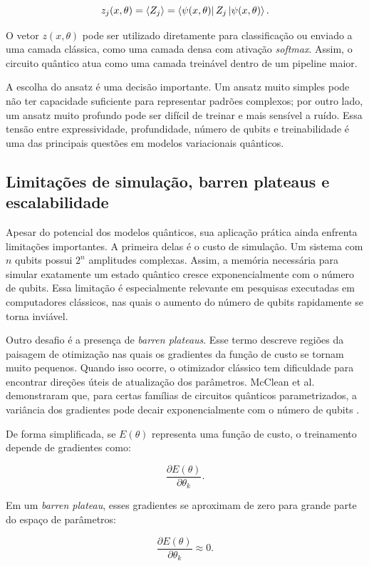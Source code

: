 \documentclass[
    12pt,
    openright,
    oneside,
    a4paper,
    english,
    brazil
]{abntex2}
\begin{document}
\[
z_j(x,\theta)
=
\langle Z_j \rangle
=
\bra{\psi(x,\theta)}
Z_j
\ket{\psi(x,\theta)}.
\]

O vetor \(z(x,\theta)\) pode ser utilizado diretamente para classificação ou enviado a uma camada clássica, como uma camada densa com ativação \textit{softmax}. Assim, o circuito quântico atua como uma camada treinável dentro de um pipeline maior.

A escolha do ansatz é uma decisão importante. Um ansatz muito simples pode não ter capacidade suficiente para representar padrões complexos; por outro lado, um ansatz muito profundo pode ser difícil de treinar e mais sensível a ruído. Essa tensão entre expressividade, profundidade, número de qubits e treinabilidade é uma das principais questões em modelos variacionais quânticos.

\subsection{Limitações de simulação, barren plateaus e escalabilidade}

Apesar do potencial dos modelos quânticos, sua aplicação prática ainda enfrenta limitações importantes. A primeira delas é o custo de simulação. Um sistema com \(n\) qubits possui \(2^n\) amplitudes complexas. Assim, a memória necessária para simular exatamente um estado quântico cresce exponencialmente com o número de qubits. Essa limitação é especialmente relevante em pesquisas executadas em computadores clássicos, nas quais o aumento do número de qubits rapidamente se torna inviável.

Outro desafio é a presença de \textit{barren plateaus}. Esse termo descreve regiões da paisagem de otimização nas quais os gradientes da função de custo se tornam muito pequenos. Quando isso ocorre, o otimizador clássico tem dificuldade para encontrar direções úteis de atualização dos parâmetros. McClean et al. demonstraram que, para certas famílias de circuitos quânticos parametrizados, a variância dos gradientes pode decair exponencialmente com o número de qubits \cite{mcclean2018barren}.

De forma simplificada, se \(E(\theta)\) representa uma função de custo, o treinamento depende de gradientes como:

\[
\frac{\partial E(\theta)}{\partial \theta_k}.
\]

Em um \textit{barren plateau}, esses gradientes se aproximam de zero para grande parte do espaço de parâmetros:

\[
\frac{\partial E(\theta)}{\partial \theta_k}
\approx 0.
\]
\end{document}
